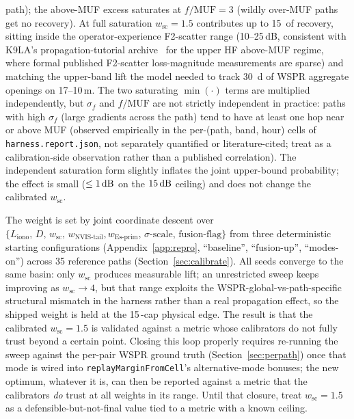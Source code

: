 \documentclass[11pt,a4paper]{article}
\newcommand{\SI}[2]{#1\,\text{#2}}
\newcommand{\dB}{\text{dB}}
\begin{document}
path); the above-MUF excess saturates at $f/\text{MUF} = 3$ (wildly
over-MUF paths get no recovery).  At full saturation
$w_{\text{sc}} = 1.5$ contributes up to \SI{15}{\dB} of recovery,
sitting inside the operator-experience F2-scatter range
(10--25\,dB, consistent with K9LA's
propagation-tutorial archive~\cite{k9la} for the upper HF
above-MUF regime, where formal published F2-scatter
loss-magnitude measurements are sparse) and
matching the upper-band lift the model needed to track 30~d of
WSPR aggregate openings on 17--10\,m.  The two saturating
$\min(\cdot)$ terms are multiplied independently, but
$\sigma_{f}$ and $f/\text{MUF}$ are not strictly independent in
practice: paths with high $\sigma_{f}$ (large gradients across
the path) tend to have at least one hop near or above MUF
(observed empirically in the per-(path, band, hour) cells of
\texttt{harness.report.json}, not separately quantified or
literature-cited; treat as a calibration-side observation
rather than a published correlation).  The independent
saturation form slightly inflates the joint upper-bound
probability; the effect is small ($\leq \SI{1}{\dB}$ on the
$\SI{15}{\dB}$ ceiling) and does not change the calibrated
$w_{\text{sc}}$.

The weight is set by joint coordinate descent over
$\{L_{\text{iono}},\,D,\,w_{\text{sc}},\,w_{\text{NVIS-tail}},
w_{\text{Es-prim}},\,\sigma\text{-scale},\,\text{fusion-flag}\}$
from three deterministic starting configurations
(Appendix~\ref{app:repro}, ``baseline'', ``fusion-up'',
``modes-on'') across 35 reference paths
(Section~\ref{sec:calibrate}).  All seeds converge to the same
basin: only $w_{\text{sc}}$ produces measurable lift; an
unrestricted sweep keeps improving as $w_{\text{sc}}\!\to\!4$, but
that range exploits the WSPR-global-vs-path-specific structural
mismatch in the harness rather than a real propagation effect, so
the shipped weight is held at the \SI{15}{\dB}-cap physical edge.
The result is that the
calibrated $w_{\text{sc}} = 1.5$ is validated against a
metric whose calibrators do not fully trust beyond a certain point.
Closing this loop properly requires re-running the sweep against
the per-pair WSPR ground truth (Section~\ref{sec:perpath}) once
that mode is wired into \texttt{replayMarginFromCell}'s alternative-mode
bonuses; the new optimum, whatever it is, can then be reported
against a metric that the calibrators \emph{do} trust at all weights
in its range.  Until that closure, treat $w_{\text{sc}} = 1.5$ as a
defensible-but-not-final value tied to a metric with a known
ceiling.
\end{document}
